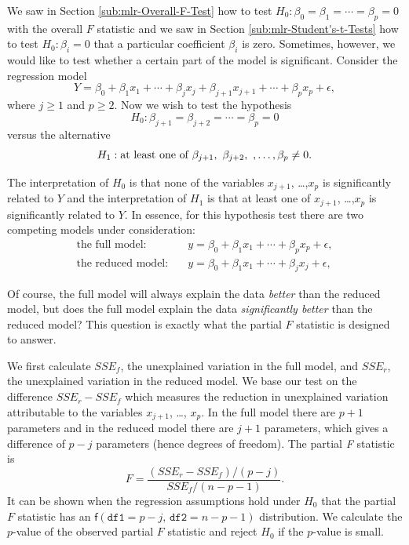 \documentclass[captions=tableheading]{scrbook}
\begin{document}
\label{sec:Partial-F-Statistic}

We saw in Section \ref{sub:mlr-Overall-F-Test} how to test \(H_{0}:\beta_{0}=\beta_{1}=\cdots=\beta_{p}=0\) with the overall \(F\) statistic and we saw in Section \ref{sub:mlr-Student's-t-Tests} how to test \(H_{0}:\beta_{i}=0\) that a particular coefficient \(\beta_{i}\) is zero. Sometimes, however, we would like to test whether a certain part of the model is significant. Consider the regression model
\begin{equation}
Y=\beta_{0}+\beta_{1}x_{1}+\cdots+\beta_{j}x_{j}+\beta_{j+1}x_{j+1}+\cdots+\beta_{p}x_{p}+\epsilon,
\end{equation}
where \(j\geq1\) and \(p\geq2\). Now we wish to test the hypothesis
\begin{equation}
H_{0}:\beta_{j+1}=\beta_{j+2}=\cdots=\beta_{p}=0
\end{equation}
versus the alternative 
\begin{equation}
H_{1}:\mbox{at least one of \ensuremath{\beta_{j+1},\ \beta_{j+2},\ ,\ldots,\beta_{p}\neq0}}.
\end{equation}

The interpretation of \(H_{0}\) is that none of the variables \(x_{j+1}\), \ldots{},\(x_{p}\) is significantly related to \(Y\) and the interpretation of \(H_{1}\) is that at least one of \(x_{j+1}\), \ldots{},\(x_{p}\) is significantly related to \(Y\). In essence, for this hypothesis test there are two competing models under consideration:
\begin{align}
\mbox{the full model:} & \quad y=\beta_{0}+\beta_{1}x_{1}+\cdots+\beta_{p}x_{p}+\epsilon,\\
\mbox{the reduced model:} & \quad y=\beta_{0}+\beta_{1}x_{1}+\cdots+\beta_{j}x_{j}+\epsilon,
\end{align}

Of course, the full model will always explain the data \emph{better} than the reduced model, but does the full model explain the data \emph{significantly better} than the reduced model? This question is exactly what the partial \(F\) statistic is designed to answer.

We first calculate \(SSE_{f}\), the unexplained variation in the full model, and \(SSE_{r}\), the unexplained variation in the reduced model. We base our test on the difference \(SSE_{r}-SSE_{f}\) which measures the reduction in unexplained variation attributable to the variables \(x_{j+1}\), \ldots{}, \(x_{p}\). In the full model there are \(p+1\) parameters and in the reduced model there are \(j+1\) parameters, which gives a difference of \(p-j\) parameters (hence degrees of freedom). The partial \emph{F} statistic is 
\begin{equation}
F=\frac{(SSE_{r}-SSE_{f})/(p-j)}{SSE_{f}/(n-p-1)}.
\end{equation}
It can be shown when the regression assumptions hold under \(H_{0}\) that the partial \(F\) statistic has an \(\mathsf{f}(\mathtt{df1}=p-j,\,\mathtt{df2}=n-p-1)\) distribution. We calculate the \(p\)-value of the observed partial \(F\) statistic and reject \(H_{0}\) if the \(p\)-value is small. 
\end{document}
